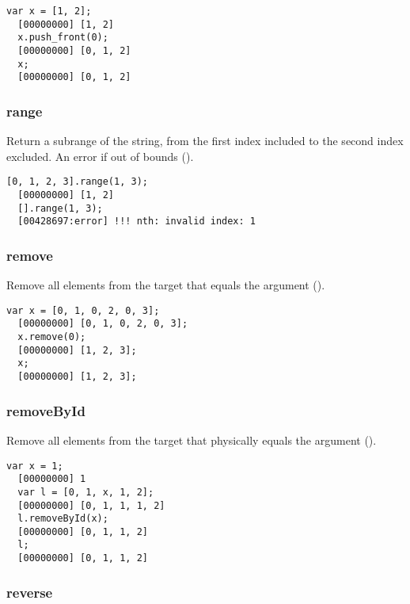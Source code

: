 \begin{lstlisting}[caption=List.push\_front, label=lst:list-pushfront, float=\floatposh]
  var x = [1, 2];
  [00000000] [1, 2]
  x.push_front(0);
  [00000000] [0, 1, 2]
  x;
  [00000000] [0, 1, 2]
\end{lstlisting}

\subsubsection{range}

Return a subrange of the string, from the first index included to the
second index excluded. An error if out of bounds ().

\begin{lstlisting}[caption=List.range, label=lst:list-range, float=\floatposh]
  [0, 1, 2, 3].range(1, 3);
  [00000000] [1, 2]
  [].range(1, 3);
  [00428697:error] !!! nth: invalid index: 1
\end{lstlisting}


\subsubsection{remove}

Remove all elements from the target that equals the argument
().

\begin{lstlisting}[caption=List.remove, label=lst:list-remove, float=\floatposh]
  var x = [0, 1, 0, 2, 0, 3];
  [00000000] [0, 1, 0, 2, 0, 3];
  x.remove(0);
  [00000000] [1, 2, 3];
  x;
  [00000000] [1, 2, 3];
\end{lstlisting}

\subsubsection{removeById}

Remove all elements from the target that physically equals the
argument ().

\begin{lstlisting}[caption=List.removeById, label=lst:list-removeById,
  float=\floatposh]
  var x = 1;
  [00000000] 1
  var l = [0, 1, x, 1, 2];
  [00000000] [0, 1, 1, 1, 2]
  l.removeById(x);
  [00000000] [0, 1, 1, 2]
  l;
  [00000000] [0, 1, 1, 2]
\end{lstlisting}

\subsubsection{reverse}

